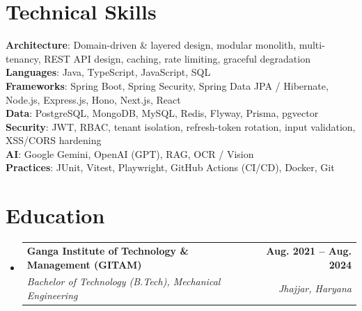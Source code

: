\documentclass[letterpaper,11pt]{article}
\makeatletter
\newcommand{\resumeSubheading}[4]{
  \vspace{-2pt}\item
    \begin{tabular*}{1.0\textwidth}[t]{l@{\extracolsep{\fill}}r}
      \textbf{#1} & \textbf{\small #2} \\
      \textit{\small#3} & \textit{\small #4} \\
    \end{tabular*}\vspace{-7pt}
}
\newcommand{\resumeSubHeadingListStart}{\begin{itemize}[leftmargin=0.0in, label={}]}
\newcommand{\resumeSubHeadingListEnd}{\end{itemize}}
\makeatother
\begin{document}
\section{Technical Skills}
 \begin{itemize}[leftmargin=0.15in, label={}]
    \small{\item{
     \textbf{Architecture}{: Domain-driven \& layered design, modular monolith, multi-tenancy, REST API design, caching, rate limiting, graceful degradation} \\
     \textbf{Languages}{: Java, TypeScript, JavaScript, SQL} \\
     \textbf{Frameworks}{: Spring Boot, Spring Security, Spring Data JPA / Hibernate, Node.js, Express.js, Hono, Next.js, React} \\
     \textbf{Data}{: PostgreSQL, MongoDB, MySQL, Redis, Flyway, Prisma, pgvector} \\
     \textbf{Security}{: JWT, RBAC, tenant isolation, refresh-token rotation, input validation, XSS/CORS hardening} \\
     \textbf{AI}{: Google Gemini, OpenAI (GPT), RAG, OCR / Vision} \\
     \textbf{Practices}{: JUnit, Vitest, Playwright, GitHub Actions (CI/CD), Docker, Git} \\
    }}
 \end{itemize}
\vspace{-9pt}

\section{Education}
  \resumeSubHeadingListStart
    \resumeSubheading
      {Ganga Institute of Technology \& Management (GITAM)}{Aug. 2021 -- Aug. 2024}
      {Bachelor of Technology (B.Tech), Mechanical Engineering}{Jhajjar, Haryana}
  \resumeSubHeadingListEnd
\end{document}
